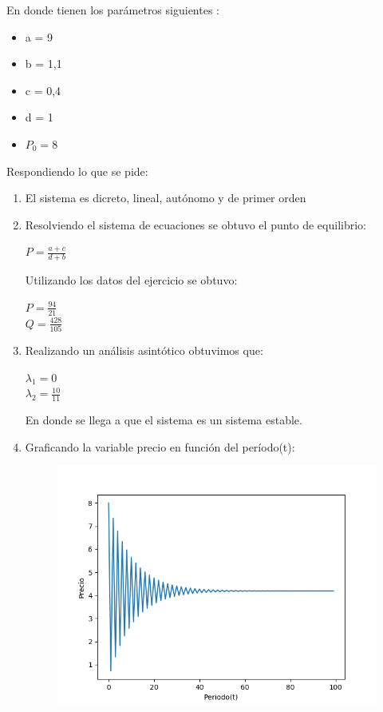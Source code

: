 \documentclass[11pt,a4paper]{article}
\begin{document}
		En donde tienen los parámetros siguientes :
		\begin{itemize}
					\item a = 9
					\item b = 1,1
					\item c = 0,4
					\item d = 1
					\item $P_0 = 8$
		\end{itemize}

		Respondiendo lo que se pide:
		\begin{enumerate}
			\item El sistema es dicreto, lineal, autónomo y de primer orden
			\item Resolviendo el sistema de ecuaciones se obtuvo el punto de equilibrio:
				\begin{center}
					$P = \frac{a+c}{d+b}$
				\end{center}
				Utilizando los datos del ejercicio se obtuvo:
				\begin{center}
					$P = \frac{94}{21}$\\
					\vspace*{0.15in}
					$Q = \frac{428}{105}$
				\end{center}
			
			\item Realizando un análisis asintótico obtuvimos que: 
				\begin{center}
					$\lambda_1 = 0$\\
					\vspace*{0.15in}
					$\lambda_2 = \frac{10}{11}$
				\end{center}
				En donde se llega a que el sistema es un sistema estable.
			\item Graficando la variable precio en función del período(t):
				\begin{figure}[H]
  					\centering
    					\includegraphics[width=14cm]{imagenes/precioTiempo}
				\end{figure}


\end{enumerate}
\end{document}

